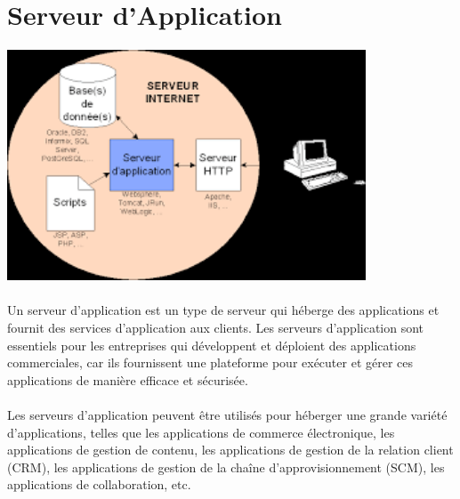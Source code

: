 \section{Serveur d'Application}
\vspace{4mm}
\paragraph{
	\includegraphics[width=0.8\textwidth]{PhotoMemoire/serveur_application.png}}
\paragraph{ }

Un serveur d'application est un type de serveur qui héberge des applications et fournit des services d'application aux clients. Les serveurs d'application sont essentiels pour les entreprises qui développent et déploient des applications commerciales, car ils fournissent une plateforme pour exécuter et gérer ces applications de manière efficace et sécurisée.
\paragraph{ }
Les serveurs d'application peuvent être utilisés pour héberger une grande variété d'applications, telles que les applications de commerce électronique, les applications de gestion de contenu, les applications de gestion de la relation client (CRM), les applications de gestion de la chaîne d'approvisionnement (SCM), les applications de collaboration, etc.

